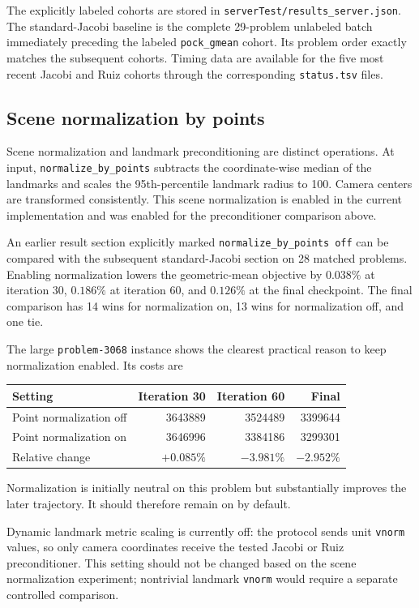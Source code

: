 \documentclass[11pt]{article}
\begin{document}
The explicitly labeled cohorts are stored in
\texttt{serverTest/results\_server.json}.  The standard-Jacobi baseline is the
complete 29-problem unlabeled batch immediately preceding the labeled
\texttt{pock\_gmean} cohort.  Its problem order exactly matches the subsequent
cohorts.  Timing data are available for the five most recent Jacobi and Ruiz
cohorts through the corresponding \texttt{status.tsv} files.

\subsection{Scene normalization by points}

Scene normalization and landmark preconditioning are distinct operations.  At
input, \texttt{normalize\_by\_points} subtracts the coordinate-wise median of
the landmarks and scales the 95th-percentile landmark radius to 100.  Camera
centers are transformed consistently.  This scene normalization is enabled in
the current implementation and was enabled for the preconditioner comparison
above.

An earlier result section explicitly marked
\texttt{normalize\_by\_points off} can be compared with the subsequent
standard-Jacobi section on 28 matched problems.  Enabling normalization lowers
the geometric-mean objective by $0.038\%$ at iteration 30, $0.186\%$ at
iteration 60, and $0.126\%$ at the final checkpoint.  The final comparison has
14 wins for normalization on, 13 wins for normalization off, and one tie.

The large \texttt{problem-3068} instance shows the clearest practical reason to
keep normalization enabled.  Its costs are
\begin{center}
\begin{tabular}{lrrr}
  \toprule
  Setting & Iteration 30 & Iteration 60 & Final \\
  \midrule
  Point normalization off & 3643889 & 3524489 & 3399644 \\
  Point normalization on  & 3646996 & 3384186 & 3299301 \\
  Relative change         & $+0.085\%$ & $-3.981\%$ & $-2.952\%$ \\
  \bottomrule
\end{tabular}
\end{center}
Normalization is initially neutral on this problem but substantially improves
the later trajectory.  It should therefore remain on by default.

Dynamic landmark metric scaling is currently off: the protocol sends unit
\texttt{vnorm} values, so only camera coordinates receive the tested Jacobi or
Ruiz preconditioner.  This setting should not be changed based on the scene
normalization experiment; nontrivial landmark \texttt{vnorm} would require a
separate controlled comparison.
\end{document}
